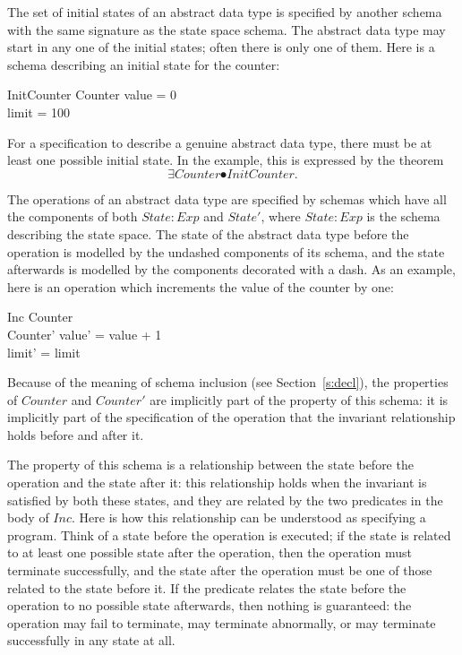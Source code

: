 The set of initial states of an abstract data type is specified by
another schema with the same signature as the state space schema.
The abstract data type may start in any one of the initial states;
often there is only one of them. Here is a schema describing an
initial state for the counter:
\begin{schema}{InitCounter}
	Counter
\where
	value = 0 \\
	limit = 100
\end{schema}
For a specification to describe a genuine abstract data type, there
must be at least one possible initial state. In the example, this is
expressed by the theorem
\[ \exists Counter \spot InitCounter. \]

The operations of an abstract data type are specified by schemas which
have all the components of both $State: Exp $ and
$State'$, where $State: Exp $ is the schema describing the state space. The
state of the abstract data type before the operation is modelled by
the undashed components of its schema, and the state afterwards is
modelled by the components decorated with a dash. As an example, here
is an operation which increments the value of the counter by one:
\begin{schema}{Inc}
	Counter \\
	Counter'
\where
	value' = value + 1 \\
	limit' = limit
\end{schema}
Because of the meaning of schema inclusion (see Section~\ref{s:decl}),
the properties of $Counter$ and $Counter'$ are implicitly part of the
property of this schema: it is implicitly part of the specification of
the operation that the invariant relationship holds before and after it.

The property of this schema is a relationship between the state before
the operation and the state after it: this relationship holds when the
invariant is satisfied by both these states, and they are related by
the two predicates in the body of $Inc$. Here is how this relationship
can be understood as specifying a program. Think of a state before the
operation is executed; if the state is related to at least one
possible state after the operation, then the operation must terminate
successfully, and the state after the operation must be one of those
related to the state before it. If the predicate relates the state
before the operation to no possible state afterwards, then nothing is
guaranteed: the operation may fail to terminate, may terminate
abnormally, or may terminate successfully in any state at all.

